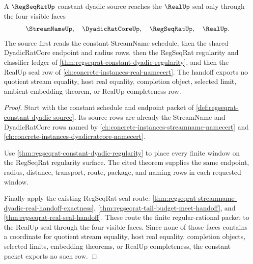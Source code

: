 \begin{theorem}
\label{thm:regseqrat-constant-real-seal-handoff}
A $\RegSeqRatUp$ constant dyadic source reaches the $\RealUp$ seal only through
the four visible faces
$$
\StreamNameUp,\quad \DyadicRatCoreUp,\quad \RegSeqRatUp,\quad \RealUp.
$$
The source first reads the constant StreamName schedule, then the shared
DyadicRatCore endpoint and radius rows, then the RegSeqRat regularity and
classifier ledger of \autoref{thm:regseqrat-constant-dyadic-regularity}, and
then the RealUp seal row of
\autoref{ch:concrete-instances-real-namecert}. The handoff exports no quotient
stream equality, host real equality, completion object, selected limit, ambient
embedding theorem, or RealUp completeness row.
\end{theorem}
\begin{proof}
Start with the constant schedule and endpoint packet of
\autoref{def:regseqrat-constant-dyadic-source}. Its source rows are already the
StreamName and DyadicRatCore rows named by
\autoref{ch:concrete-instances-streamname-namecert} and
\autoref{ch:concrete-instances-dyadicratcore-namecert}.

Use \autoref{thm:regseqrat-constant-dyadic-regularity} to place every finite
window on the RegSeqRat regularity surface. The cited theorem supplies the
same endpoint, radius, distance, transport, route, package, and naming rows in
each requested window.

Finally apply the existing RegSeqRat seal route:
\autoref{thm:regseqrat-streamname-dyadic-real-handoff-exactness},
\autoref{thm:regseqrat-tail-budget-meet-handoff}, and
\autoref{thm:regseqrat-real-seal-handoff}. These route the finite
regular-rational packet to the RealUp seal through the four visible faces.
Since none of those faces contains a coordinate for quotient stream equality,
host real equality, completion objects, selected limits, embedding theorems, or
RealUp completeness, the constant packet exports no such row.
\end{proof}

